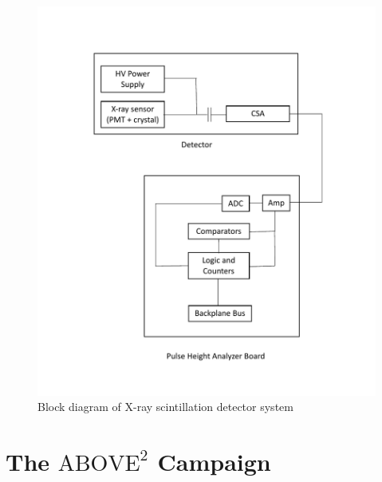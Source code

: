 \begin{figure}[p]
    \centering
    \includegraphics[width=1.0\textwidth]{figures/chapter_5/detector_block_diagram/detector_block_diagram}
    \caption{Block diagram of X-ray scintillation detector system}
    \label{detector_block_diagram}
\end{figure}

\newpage

\section{The $\text{ABOVE}^2$ Campaign}


